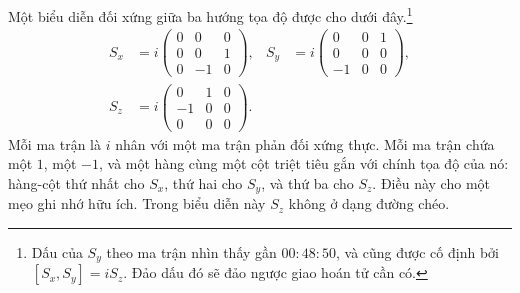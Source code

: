 Một biểu diễn đối xứng giữa ba hướng tọa độ được cho dưới đây.\footnote{Dấu của \(S_y\) theo ma trận nhìn thấy gần \(00{:}48{:}50\), và cũng được cố định bởi \([S_x,S_y]=iS_z\). Đảo dấu đó sẽ đảo ngược giao hoán tử cần có.}
\begin{equation}
\begin{aligned}
S_x
&=
i
\begin{pmatrix}
0&0&0\\
0&0&1\\
0&-1&0
\end{pmatrix},
&
S_y
&=
i
\begin{pmatrix}
0&0&1\\
0&0&0\\
-1&0&0
\end{pmatrix},\\
S_z
&=
i
\begin{pmatrix}
0&1&0\\
-1&0&0\\
0&0&0
\end{pmatrix}.
\end{aligned}
\end{equation}
Mỗi ma trận là \(i\) nhân với một ma trận phản đối xứng thực. Mỗi ma trận chứa một \(1\), một \(-1\), và một hàng cùng một cột triệt tiêu gắn với chính tọa độ của nó: hàng-cột thứ nhất cho \(S_x\), thứ hai cho \(S_y\), và thứ ba cho \(S_z\). Điều này cho một mẹo ghi nhớ hữu ích. Trong biểu diễn này \(S_z\) không ở dạng đường chéo.

